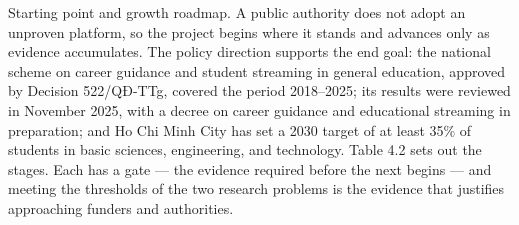 Starting point and growth roadmap. A public authority does not adopt an unproven platform, so the project begins where it stands and advances only as evidence accumulates. The policy direction supports the end goal: the national scheme on career guidance and student streaming in general education, approved by Decision 522/QĐ-TTg, covered the period 2018--2025\cite{r95}; its results were reviewed in November 2025, with a decree on career guidance and educational streaming in preparation\cite{r96}; and Ho Chi Minh City has set a 2030 target of at least 35\% of students in basic sciences, engineering, and technology\cite{r97}. Table 4.2 sets out the stages. Each has a gate --- the evidence required before the next begins --- and meeting the thresholds of the two research problems is the evidence that justifies approaching funders and authorities.

